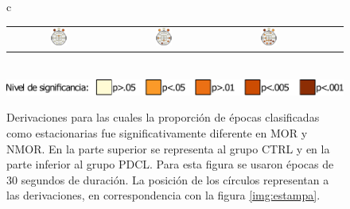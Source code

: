\documentclass[10pt,a4paper]{article}
\begin{document}
\begin{figure}
\begin{tabular}{c}
\begin{tabular}{ccccc}
\includegraphics[width=0.17\textwidth]{./img_art_dfa/prop_JGZ_30.pdf} &
\includegraphics[width=0.17\textwidth]{./img_art_dfa/prop_AEFP_30.pdf} &
\includegraphics[width=0.17\textwidth]{./img_art_dfa/prop_PCM_30.pdf} \\
\end{tabular}
 \\
\includegraphics[scale=.7]{./img_art_dfa/escala.pdf} \\
\end{tabular}
\caption{Derivaciones para las cuales la proporción de épocas clasificadas como estacionarias fue significativamente diferente en MOR y NMOR.
%
En la parte superior se representa al grupo CTRL y en la parte inferior al grupo PDCL.
%
Para esta figura se usaron épocas de 30 segundos de duración.
%
La posición de los círculos representan a las derivaciones, en correspondencia con la figura \ref{img:estampa}.}
\label{cabeza_new}
\end{figure}
\end{document}
